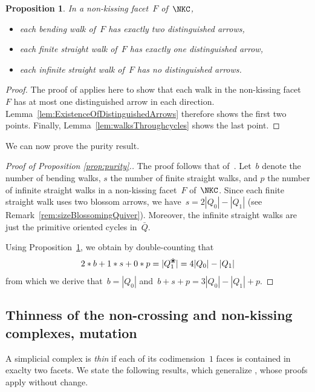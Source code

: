 \documentclass{amsart}
\newtheorem{proposition}[theorem]{Proposition}
\theoremstyle{definition}
\newcommand{\darkblue}{\color{darkblue}} %
\newcommand{\defn}[1]{\textsl{\darkblue #1}} %
\newcommand{\blossom}{^\text{\ding{96}}} %
\begin{document}
\begin{proposition}
\label{prop:numberOfDistinguishedArrows}
In a non-kissing facet~$F$ of~$\NKC$,
\begin{itemize}
 \item each bending walk of~$F$ has exactly two distinguished arrows,
 \item each finite straight walk of~$F$ has exactly one distinguished arrow,
 \item each infinite straight walk of~$F$ has no distinguished arrows.
\end{itemize}
\end{proposition}

\begin{proof}
The proof of \cite[Prop.~2.26]{PaluPilaudPlamondon} applies here to show that each walk in the non-kissing facet~$F$ has at most one distinguished arrow in each direction.
Lemma~\ref{lem:ExistenceOfDistinguishedArrows} therefore shows the first two points.
Finally, Lemma~\ref{lem:walksThroughcycles} shows the last point.
\end{proof}
 
We can now prove the purity result.

\begin{proof}[Proof of Proposition \ref{prop:purity}.]
The proof follows that of~\cite[Cor.~2.27]{PaluPilaudPlamondon}.
Let~$b$ denote the number of bending walks, $s$ the number of finite straight walks, and $p$ the number of infinite straight walks in a non-kissing facet~$F$ of~$\NKC$.
Since each finite straight walk uses two blossom arrows, we have~$s = 2|Q_0|-|Q_1|$ (see Remark~\ref{rem:sizeBlossomingQuiver}).
Moreover, the infinite straight walks are just the primitive oriented cycles in~$\bar Q$.

Using Proposition~\ref{prop:numberOfDistinguishedArrows}, we obtain by double-counting that
\[
2 * b + 1 * s + 0 * p= |Q_1\blossom| = 4|Q_0|-|Q_1|
\]
from which we derive that~$b = |Q_0|$ and~$b+s+p = 3|Q_0|-|Q_1|+p$.
\end{proof}

\subsection{Thinness of the non-crossing and non-kissing complexes, mutation}

A simplicial complex is \defn{thin} if each of its codimension~$1$ faces is contained in exaclty two facets.
We state the following results, which generalize \cite[Prop.~2.31 \& Cor.~2.33]{PaluPilaudPlamondon}, whose proofs apply without change.
\end{document}
